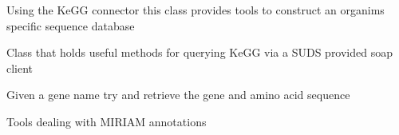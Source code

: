 \documentclass[a4paper,11pt,english]{sphinxmanual}
\begin{document}

\begin{fulllineitems}
\label{modules_doc:cbmpy.CBNetDB.KeGGSequenceTools}
Using the KeGG connector this class provides tools to construct an organims specific sequence database

\end{fulllineitems}


\begin{fulllineitems}
\label{modules_doc:cbmpy.CBNetDB.KeGGTools}
Class that holds useful methods for querying KeGG via a SUDS provided soap client

\begin{fulllineitems}
\label{modules_doc:cbmpy.CBNetDB.KeGGTools.fetchSeqfromKeGG}
Given a gene name try and retrieve the gene and amino acid sequence

\end{fulllineitems}


\end{fulllineitems}


\begin{fulllineitems}
\label{modules_doc:cbmpy.CBNetDB.MIRIAMTools}
Tools dealing with MIRIAM annotations

\end{fulllineitems}

\end{document}
